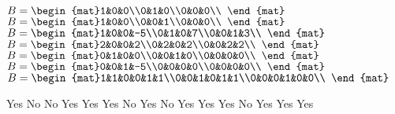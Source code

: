 \begin{Exercise}[
name={},
title={}, 
difficulty=0,
origin={\cite{GH}}]
\begin{multicols}{2}
\Question $B = \begin{mat}1&0&0\\0&1&0\\0&0&0\\ \end{mat}$
\Question $B = \begin{mat}1&0&0\\0&0&1\\0&0&0\\ \end{mat}$
\Question $B = \begin{mat}1&0&0&-5\\0&1&0&7\\0&0&1&3\\ \end{mat}$
\Question $B = \begin{mat}2&0&0&2\\0&2&0&2\\0&0&2&2\\ \end{mat}$
\Question $B = \begin{mat}0&1&0&0\\0&0&1&0\\0&0&0&0\\ \end{mat}$
\Question $B = \begin{mat}0&0&1&-5\\0&0&0&0\\0&0&0&0\\ \end{mat}$
\Question $B = \begin{mat}1&1&0&0&1&1\\0&0&1&0&1&1\\0&0&0&1&0&0\\ \end{mat}$
\EndCurrentQuestion
\end{multicols}
\end{Exercise}

\begin{Answer}
\Question Yes
\Question No
\Question No
\Question Yes
\Question Yes
\Question Yes
\Question No
\Question Yes
\Question No
\Question Yes
\Question Yes
\Question Yes
\Question No
\Question Yes
\Question Yes
\Question Yes
\end{Answer}
